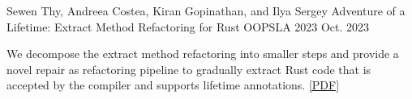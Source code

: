 

\begin{cventries}

  \cventry
    {Sewen Thy, Andreea Costea, Kiran Gopinathan, and Ilya Sergey} %
    {Adventure of a Lifetime: Extract Method Refactoring for Rust} %
    {OOPSLA 2023} %
    {Oct. 2023} %
    {
     \begin{cvitems} %
        \item {We decompose the extract method refactoring into smaller
        steps and provide a novel repair as refactoring pipeline to
        gradually extract Rust code that is accepted by the compiler and
        supports lifetime annotations. \href{https://fastmail-resource.sewenthy.dev/public/academics/rem-oopsla23.pdf}{[PDF]}}
     \end{cvitems}
    }

\end{cventries}
